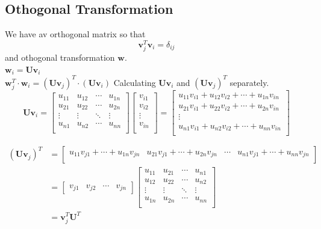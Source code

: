 \documentclass{article}
\begin{document}
\subsection{Othogonal Transformation}
We have av orthogonal matrix so that
$$\mathbf{v}_j^T\mathbf{v}_i=\delta_{ij}$$
and othogonal transformation $\mathbf{w}$.\\
\vskip0.1cm
$\mathbf{w}_i=\mathbf{Uv}_i$\\
\vskip0.1cm
$\mathbf{w}_j^T\cdot \mathbf{w}_i=(\mathbf{Uv}_j)^T\cdot (\mathbf{Uv}_i)$
\vskip0.5cm
Calculating $\mathbf{Uv}_i$ and $(\mathbf{Uv}_j)^T$ separately.
\begin{equation*}
\mathbf{Uv}_i=\begin{bmatrix}
u_{11} & u_{12} & \cdots & u_{1n}\\
u_{21} & u_{22} & \cdots & u_{2n}\\
\vdots & \vdots & \ddots & \vdots\\
u_{n1} & u_{n2} & \cdots & u_{nn}\\
\end{bmatrix} \begin{bmatrix}
v_{i1} \\
v_{i2} \\
\vdots \\
v_{in} \\
\end{bmatrix}=\begin{bmatrix}
u_{11}v_{i1} + u_{12}v_{i2} + \cdots + u_{1n}v_{in}\\
u_{21}v_{i1} + u_{22}v_{i2} + \cdots + u_{2n}v_{in}\\
\vdots \\
u_{n1}v_{i1} +  u_{n2}v_{i2} + \cdots + u_{nn}v_{in}\\
\end{bmatrix}
\end{equation*}



\begin{equation*}
\begin{split}
(\mathbf{Uv}_j)^T&=\begin{bmatrix}
u_{11}v_{j1} + \cdots + u_{1n}v_{jn} &
u_{21}v_{j1} +  \cdots + u_{2n}v_{jn} &
\cdots &
u_{n1}v_{j1} + \cdots + u_{nn}v_{jn}\\
\end{bmatrix}\\
&=\begin{bmatrix}
v_{j1} &
v_{j2} &
\cdots &
v_{jn}
\end{bmatrix}\begin{bmatrix}
u_{11} & u_{21} & \cdots & u_{n1}\\
u_{12} & u_{22} & \cdots & u_{n2}\\
\vdots & \vdots & \ddots & \vdots\\
u_{1n} & u_{2n} & \cdots & u_{nn}\\
\end{bmatrix} \\
&=\mathbf{v}_j^T\mathbf{U}^T
\end{split}
\end{equation*}
\end{document}
